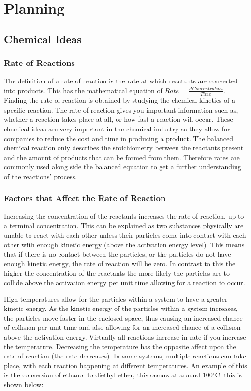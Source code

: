 \chapter {Planning}

\section {Chemical Ideas}


	\subsection{Rate of Reactions}

The definition of a rate of reaction is the rate at which reactants are converted into products. This has the mathematical equation of $Rate = \frac{\Delta Concentration}{Time}$. Finding the rate of reaction is obtained by studying the chemical kinetics of a specific reaction. The rate of reaction gives you important information such as, whether a reaction takes place at all, or how fast a reaction will occur. These chemical ideas are very important in the chemical industry as they allow for companies to reduce the cost and time in producing a product. The balanced chemical reaction only describes the stoichiometry between the reactants present and the amount of products that can be formed from them. Therefore rates are commonly used along side the balanced equation to get a further understanding of the reactions' process.

	\subsection{Factors that Affect the Rate of Reaction} \label{factors}

Increasing the concentration of the reactants increases the rate of reaction, up to a terminal concentration. This can be explained as two substances physically are unable to react with each other unless their particles come into contact with each other with enough kinetic energy (above the activation energy level). This means that if there is no contact between the particles, or the particles do not have enough kinetic energy, the rate of reaction will be zero. In contrast to this the higher the concentration of the reactants the more likely the particles are to collide above the activation energy per unit time allowing for a reaction to occur.

High temperatures allow for the particles within a system to have a greater kinetic energy. As the kinetic energy of the particles within a system increases, the particles move faster in the enclosed space, thus causing an increased chance of collision per unit time and also allowing for an increased chance of a collision above the activation energy. Virtually all reactions increase in rate if you increase the temperature. Decreasing the temperature has the opposite affect upon the rate of reaction (the rate decreases). In some systems, multiple reactions can take place, with each reaction happening at different temperatures. An example of this is the conversion of ethanol to diethyl ether, this occurs at around 100$^{\circ}$C, this is shown below:

